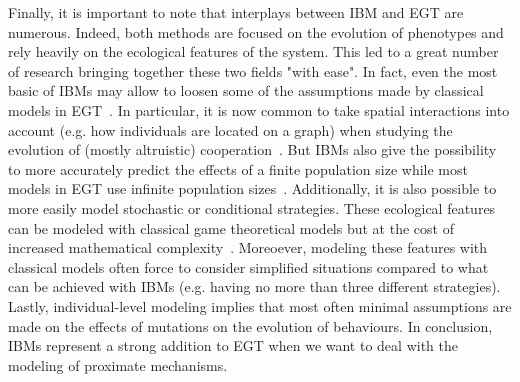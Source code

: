 
        Finally, it is important to note that interplays between IBM and EGT are numerous. Indeed, both methods are focused on the evolution of phenotypes and rely heavily on the ecological features of the system. This led to a great number of research bringing together these two fields "with ease". In fact, even the most basic of IBMs may allow to loosen some of the assumptions made by classical models in EGT~\parencite{Adami2014}. In particular, it is now common to take spatial interactions into account (e.g. how individuals are located on a graph) when studying the evolution of (mostly altruistic) cooperation~\parencite{Hauert2004}. But IBMs also give the possibility to more accurately predict the effects of a finite population size while most models in EGT use infinite population sizes~\parencite{Hauert2009}. Additionally, it is also possible to more easily model stochastic or conditional strategies. These ecological features can be modeled with classical game theoretical models but at the cost of increased mathematical complexity~\parencite{Hauert2009}. Moreoever, modeling these features with classical models often force to consider simplified situations compared to what can be achieved with IBMs (e.g. having no more than three different strategies). Lastly, individual-level modeling implies that most often minimal assumptions are made on the effects of mutations on the evolution of behaviours. In conclusion, IBMs represent a strong addition to EGT when we want to deal with the modeling of proximate mechanisms.



